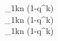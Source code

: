 {\prod_{1\leq k\leq n} (1-q^k)}
\\
{{\displaystyle\prod_{1\leq k\leq n} (1-q^k)}}
\\
{{\displaystyle\prod\nolimits_{1\leq k\leq n} (1-q^k)}}

